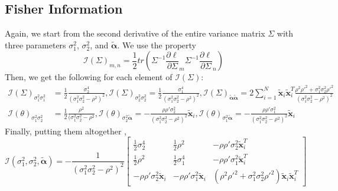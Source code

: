 \documentclass[aoas,authoryear, preprint]{imsart}
\numberwithin{equation}{section}
\theoremstyle{plain}
\begin{document}
\subsection*{Fisher Information}
Again, we start from the second derivative of the entire variance matrix $\Sigma$ with three parameters $\sigma_1^2$, $\sigma_2^2$, and $\tilde{\bm{\alpha}}$. We use the property
$$\mathcal{I}(\Sigma)_{m,n}= \frac{1}{2} tr\left(  \Sigma^{-1}\frac{\partial \ell}{\partial \Sigma}_m \Sigma^{-1} \frac{\partial \ell}{\partial \Sigma}_n\right)$$
Then, we get the following for each element of $\mathcal{I}(\Sigma)$:
\begin{align*}
    \mathcal{I}(\Sigma)_{\sigma_1^2 \sigma_1^2} &=
    \frac{1}{2} \frac{\sigma_2^4}{(\sigma_1^2\sigma_2^2 - \rho^2)^2}, 
    \mathcal{I}(\Sigma)_{\sigma_2^2\sigma_2^2} =
    \frac{1}{2} \frac{\sigma_1^4}{(\sigma_1^2\sigma_2^2 - \rho^2)^2}, 
    \mathcal{I}(\Sigma)_{\tilde{\bm{\alpha}}\tilde{\bm{\alpha}}} = 2\sum_{i=1}^{N} \bm{\tilde{x}}_i \bm{\tilde{x}}_i^T \frac{\rho^2 \rho'^2 + \sigma_1^2\sigma_2^2\rho'^2}{(\sigma_1^2\sigma_2^2 - \rho^2)^2}\\
    \mathcal{I}(\theta)_{\sigma_1^2\sigma_2^2} &=
    \frac{1}{2}\frac{\rho^2}{(\sigma_1^2\sigma_2^2-\rho^2},
    \mathcal{I}(\theta)_{\sigma_2^2\bm{\tilde{\alpha}}} =-\frac{\rho \rho'\sigma_2^2}{(\sigma_1^2\sigma_2^2 - \rho^2)^2}\bm{\tilde{x}}_i, 
    \mathcal{I}(\theta)_{\sigma_1^2\bm{\tilde{\alpha}}} = -\frac{\rho \rho'\sigma_1^2}{(\sigma_1^2\sigma_2^2 - \rho^2)^2}\bm{\tilde{x}}_i
\end{align*}
Finally, putting them altogether ,
\begin{equation*}
\mathcal{I}(\sigma_1^2, \sigma_2^2, \bm{\tilde{\alpha}}) = -\frac{1}{(\sigma_1^2\sigma_2^2 - \rho^2)^2}\begin{bmatrix}
\frac{1}{2} \sigma_2^4 & \frac{1}{2} \rho^2 & -\rho\rho'\sigma_2^2 \bm{\tilde{x}}_i^T\\
\frac{1}{2} \rho^2 & \frac{1}{2} \sigma_1^4 & -\rho \rho'\sigma_1^2 \bm{\tilde{x}}_i^T \\
-\rho \rho'\sigma_2^2 \bm{\tilde{x}}_i & -\rho \rho'\sigma_1^2\bm{\tilde{x}}_i &  (\rho^2 \rho'^2 + \sigma_1^2\sigma_2^2 \rho'^2)\bm{\tilde{x}}_i \bm{\tilde{x}}_i^T
\end{bmatrix}
\end{equation*}
\end{document}
